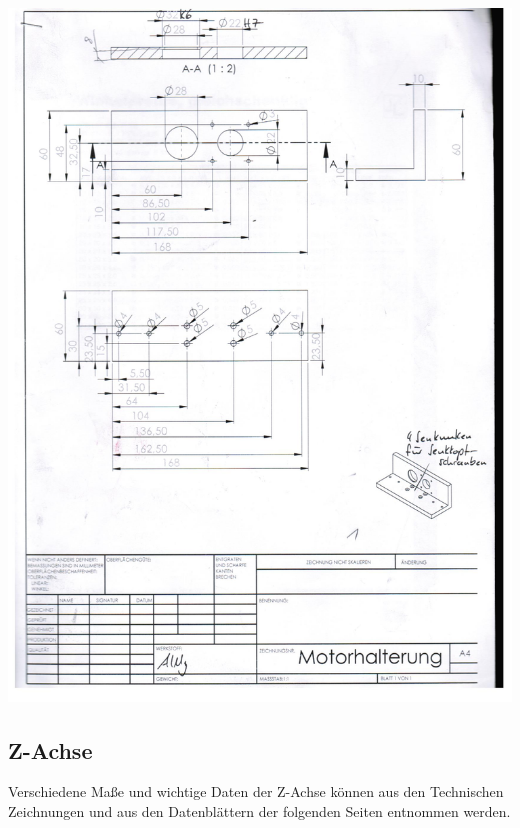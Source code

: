 \includegraphics[height=1\textheight]{Anhang/Technische_Zeichnungen_Greifer/12.jpg}













\subsection{Z-Achse}

Verschiedene Maße und wichtige Daten der Z-Achse können aus den Technischen Zeichnungen und aus den Datenblättern der folgenden Seiten entnommen werden.\\

